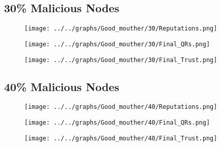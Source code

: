 \begin{minipage}[t]{0.49\columnwidth}
\subsection*{30\% Malicious Nodes}
    \begin{figure}[H]
        \centering
        \texttt{[image: ../../graphs/Good\_mouther/30/Reputations.png]}
    \end{figure}
    \begin{figure}[H]
        \centering
        \texttt{[image: ../../graphs/Good\_mouther/30/Final\_QRs.png]}
    \end{figure}
\end{minipage}
\begin{minipage}[t]{0.49\columnwidth}
    \begin{figure}[H]
        \centering
        \texttt{[image: ../../graphs/Good\_mouther/30/Final\_Trust.png]}
    \end{figure}
\end{minipage}

\begin{minipage}[t]{0.49\columnwidth}
\subsection*{40\% Malicious Nodes}
    \begin{figure}[H]
        \centering
        \texttt{[image: ../../graphs/Good\_mouther/40/Reputations.png]}
    \end{figure}
    \begin{figure}[H]
        \centering
        \texttt{[image: ../../graphs/Good\_mouther/40/Final\_QRs.png]}
    \end{figure}
\end{minipage}
\begin{minipage}[t]{0.49\columnwidth}
    \begin{figure}[H]
        \centering
        \texttt{[image: ../../graphs/Good\_mouther/40/Final\_Trust.png]}
    \end{figure}
\end{minipage}

